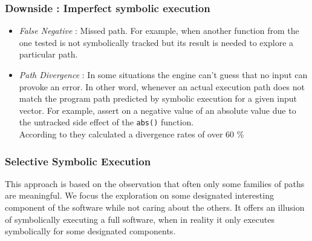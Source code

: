 \documentclass[11pt]{IEEEtran}
\begin{document}
    		\subsubsection*{Downside : Imperfect symbolic execution}
    			\begin{itemize} %
    				\item \emph{False Negative} : Missed path. For example, when another function from the one tested is not symbolically tracked but its result is needed to explore a particular path.
    				\item \emph{Path Divergence} : In some situations the engine can't guess that no input can provoke an error. In other word, whenever an actual execution path does not match the program path predicted by symbolic execution for a given input vector. For example, assert on a negative value of an absolute value due to the untracked side effect of the \texttt{abs()} function.\\
    				According to \cite{Godefroid2008AutomatedWF} they calculated a divergence rates of over 60 \%
    			\end{itemize}

    	\subsubsection{Selective Symbolic Execution}
    	\label{subsec:selectiveSymbolicExec}
    		This approach is based on the observation that often only some families of paths are meaningful\cite{chipounov2012s2e}. We focus the exploration on some designated interesting component of the software while not caring about the others. It offers an illusion of symbolically executing a full software, when in reality it only executes symbolically for some designated components.\\
\end{document}
